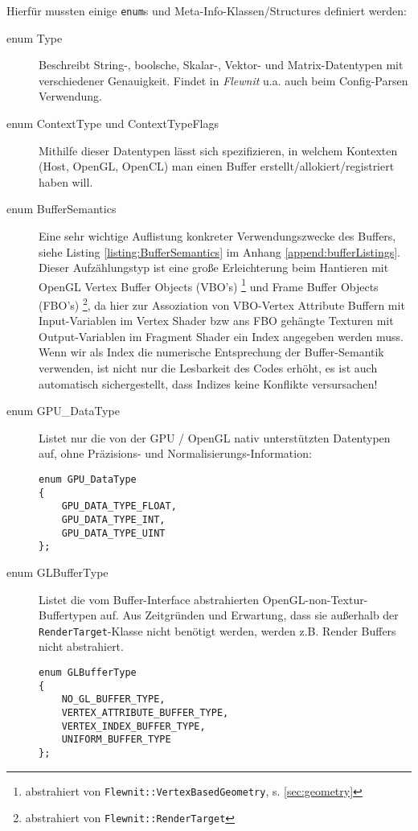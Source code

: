 	Hierfür mussten einige \lstinline|enum|s und Meta-Info-Klassen/Structures definiert werden:
	\begin{description}
		
		\item[enum Type] 
		Beschreibt String-, boolsche, Skalar-, Vektor- und Matrix-Datentypen mit verschiedener 
		Genauigkeit. Findet in \emph{Flewnit} u.a. auch beim Config-Parsen Verwendung.
		
		\item[enum ContextType und ContextTypeFlags] 
		Mithilfe dieser Datentypen lässt sich spezifizieren, in welchem 
		Kontexten (Host, OpenGL, OpenCL) man einen Buffer erstellt/allokiert/registriert haben will.
		
		\item[enum BufferSemantics] 
		Eine sehr wichtige Auflistung konkreter Verwendungszwecke des Buffers,
		siehe Listing \ref{listing:BufferSemantics} im Anhang \ref{append:bufferListings}.
		Dieser Aufzählungstyp ist eine große Erleichterung beim Hantieren mit OpenGL Vertex Buffer Objects (VBO's) 
		\footnote{abstrahiert von \lstinline|Flewnit::VertexBasedGeometry|, s. \ref{sec:geometry} }
		und Frame Buffer Objects (FBO's) 
		\footnote{abstrahiert von \lstinline|Flewnit::RenderTarget|}, 
		da hier zur Assoziation von VBO-Vertex Attribute Buffern mit Input-Variablen im Vertex Shader
		bzw ans FBO gehängte Texturen mit Output-Variablen im Fragment Shader
		ein Index angegeben werden muss. 
		Wenn wir als Index die numerische Entsprechung der Buffer-Semantik verwenden, 
		ist nicht nur die Lesbarkeit des Codes erhöht, es ist auch automatisch sichergestellt, 
		dass Indizes keine Konflikte versursachen!
		
		\item[enum GPU\_DataType] Listet nur die von der GPU / OpenGL nativ unterstützten Datentypen auf, ohne
		Präzisions- und Normalisierungs-Information:
		\begin{lstlisting}		
enum GPU_DataType
{
	GPU_DATA_TYPE_FLOAT,
	GPU_DATA_TYPE_INT,
	GPU_DATA_TYPE_UINT
};
		\end{lstlisting}
		
		\item[enum GLBufferType]
		Listet die vom Buffer-Interface abstrahierten OpenGL-non-Textur-Buffertypen auf. 
		Aus Zeitgründen und Erwartung, dass sie außerhalb der \lstinline|RenderTarget|-Klasse nicht benötigt werden,
		werden z.B. Render Buffers nicht abstrahiert.
		\begin{lstlisting}		
enum GLBufferType
{
	NO_GL_BUFFER_TYPE,
	VERTEX_ATTRIBUTE_BUFFER_TYPE,
	VERTEX_INDEX_BUFFER_TYPE,
	UNIFORM_BUFFER_TYPE 
};
		\end{lstlisting}	
	

\end{description}
